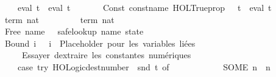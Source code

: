 \begin{isabellebody}
\ \ \ \ \ \ \ \ \ \ {\isacharparenleft}{\kern0pt}eval\ t{}{\isacharparenright}{\kern0pt}\ {\isacharasterisk}{\kern0pt}\ {\isacharparenleft}{\kern0pt}eval\ t{}{\isacharparenright}{\kern0pt}\isanewline
\ \ \ \ \ \ {\isacharbar}{\kern0pt}\ Const\ {\isacharparenleft}{\kern0pt}{\isacharat}{\kern0pt}{\isacharbraceleft}{\kern0pt}const{\isacharunderscore}{\kern0pt}name\ {\isachardoublequote}{\kern0pt}HOL{\isachardot}{\kern0pt}Trueprop{\isachardoublequote}{\kern0pt}{\isacharbraceright}{\kern0pt}{\isacharcomma}{\kern0pt}\ {\isacharunderscore}{\kern0pt}{\isacharparenright}{\kern0pt}\ {\isachardollar}{\kern0pt}\ t{}\ {\isacharequal}{\kern0pt}{\isachargreater}{\kern0pt}\ eval\ t{}\isanewline
\ \ \ \ \ \ {\isacharbar}{\kern0pt}\ {\isacharat}{\kern0pt}{\isacharbraceleft}{\kern0pt}term\ {\isachardoublequote}{\kern0pt}{}{\isacharcolon}{\kern0pt}{\isacharcolon}{\kern0pt}nat{\isachardoublequote}{\kern0pt}{\isacharbraceright}{\kern0pt}\ {\isacharequal}{\kern0pt}{\isachargreater}{\kern0pt}\ {}\isanewline
\ \ \ \ \ \ {\isacharbar}{\kern0pt}\ {\isacharat}{\kern0pt}{\isacharbraceleft}{\kern0pt}term\ {\isachardoublequote}{\kern0pt}{}{\isacharcolon}{\kern0pt}{\isacharcolon}{\kern0pt}nat{\isachardoublequote}{\kern0pt}{\isacharbraceright}{\kern0pt}\ {\isacharequal}{\kern0pt}{\isachargreater}{\kern0pt}\ {}\isanewline
\ \ \ \ \ \ {\isacharbar}{\kern0pt}\ Free\ {\isacharparenleft}{\kern0pt}name{\isacharcomma}{\kern0pt}\ {\isacharunderscore}{\kern0pt}{\isacharparenright}{\kern0pt}\ {\isacharequal}{\kern0pt}{\isachargreater}{\kern0pt}\ safe{\isacharunderscore}{\kern0pt}lookup\ name\ state\isanewline
\ \ \ \ \ \ {\isacharbar}{\kern0pt}\ Bound\ i\ {\isacharequal}{\kern0pt}{\isachargreater}{\kern0pt}\ \ i\ {\isacharparenleft}{\kern0pt}{\isacharasterisk}{\kern0pt}\ Placeholder\ pour\ les\ variables\ liées\ {\isacharasterisk}{\kern0pt}{\isacharparenright}{\kern0pt}\isanewline
\ \ \ \ \ \ {\isacharbar}{\kern0pt}\ {\isacharunderscore}{\kern0pt}\ {\isacharequal}{\kern0pt}{\isachargreater}{\kern0pt}\ \isanewline
\ \ \ \ \ \ \ \ \ \ {\isacharparenleft}{\kern0pt}{\isacharasterisk}{\kern0pt}\ Essayer\ d{\isacharprime}{\kern0pt}extraire\ les\ constantes\ numériques\ {\isacharasterisk}{\kern0pt}{\isacharparenright}{\kern0pt}\isanewline
\ \ \ \ \ \ \ \ \ \ {\isacharparenleft}{\kern0pt}case\ try\ {\isacharparenleft}{\kern0pt}HOLogic{\isachardot}{\kern0pt}dest{\isacharunderscore}{\kern0pt}number\ {\isacharhash}{\kern0pt}{\isachargreater}{\kern0pt}\ snd{\isacharparenright}{\kern0pt}\ t\ of\isanewline
\ \ \ \ \ \ \ \ \ \ \ \ SOME\ n\ {\isacharequal}{\kern0pt}{\isachargreater}{\kern0pt}\ n\isanewline

\end{isabellebody}
